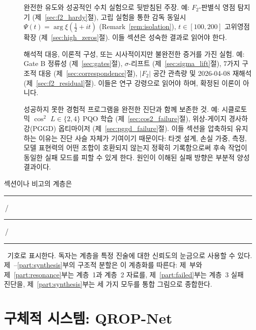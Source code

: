 \documentclass[11pt, a4paper]{article}
\theoremstyle{definition}
\theoremstyle{plain}
\newcommand{\xif}{\xi}
\newcommand{\Psip}{\Psi}
\begin{document}
\begin{description}
  \item[\textbf{\textcolor{ForestGreen}{\rule{0.9ex}{0.9ex}}\ \ 계층 1 --- 검증됨.}]
        완전한 유도와 성공적인 수치 실험으로 뒷받침된 주장. 예:
        $F_2$-판별식 영점 탐지기 (제~\ref{sec:f2_hardy}절),
        고립 실험을 통한 감독 동일시
        $\Psip(t)=\arg\xif(\tfrac{1}{2}+it)$ (Remark~\ref{rem:isolation}),
        $t\in[100,200]$ 고위영점 확장 (제~\ref{sec:high_zeros}절).
        이들 섹션은 성숙한 결과로 읽어야 한다.

  \item[\textbf{\textcolor{orange}{\rule{0.9ex}{0.9ex}}\ \ 계층 2 --- 아이디어와 부분 결과.}]
        해석적 대응, 이론적 구성, 또는 시사적이지만 불완전한 증거를 가진 실험. 예: Gate B 정류성 (제~\ref{sec:gates}절),
        $\sigma$-리프트 (제~\ref{sec:sigma_lift}절), 7가지 구조적 대응 (제~\ref{sec:correspondence}절), $|F_2|$ 공간 관측량 및 2026-04-08 재해석 (제~\ref{sec:f2_residual}절). 이들은 연구 강령으로 읽어야 하며, 확정된 이론이 아니다.

  \item[\textbf{\textcolor{red}{\rule{0.9ex}{0.9ex}}\ \ 계층 3 --- 실패한 시도와 그 진단.}]
        성공하지 못한 경험적 프로그램을 완전한 진단과 함께 보존한 것. 예: 시클로토믹 $\cos^2$ $L\in\{2,4\}$ PQO 학습 (제~\ref{sec:cos2_failure}절), 위상-게이지 경사하강(PGGD) 옵티마이저 (제~\ref{sec:pggd_failure}절). 이들 섹션을 압축하되 유지하는 이유는 진단 사슬 자체가 기여이기 때문이다: 타겟 설계, 손실 가중, 측정, 모델 표현력의 어떤 조합이 호환되지 않는지 정확히 기록함으로써 후속 작업이 동일한 실패 모드를 피할 수 있게 한다. 원인이 이해된 실패 방향은 부분적 양성 결과이다.
\end{description}

\noindent 섹션이나 비고의 계층은 \textcolor{ForestGreen}{\rule{0.9ex}{0.9ex}}\,/\textcolor{orange}{\rule{0.9ex}{0.9ex}}\,/\textcolor{red}{\rule{0.9ex}{0.9ex}}\ 기호로 표시한다. 독자는 계층을 특정 진술에 대한 신뢰도의 눈금으로 사용할 수 있다. 제~\ref{part:qropnet}--\ref{part:synthesis}부의 구조적 분할은 이 계층화를 따른다: 제~\ref{part:qropnet}부와 제~\ref{part:resonance}부는 계층~1과 계층~2 자료를, 제~\ref{part:failed}부는 계층~3 실패 진단을, 제~\ref{part:synthesis}부는 세 가지 모두를 통합 그림으로 종합한다.



\part{구체적 시스템: QROP-Net}
\label{part:qropnet}
\end{document}
